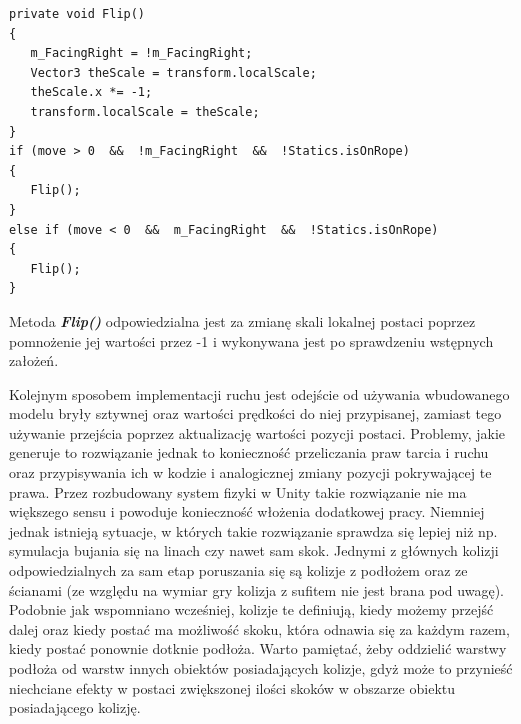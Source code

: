 \documentclass[oneside,polski,logo]{amuthesis}
\begin{document}
\begin{lstlisting}[breaklines=true,
language={[Sharp]C},
rulecolor=\color{blue!80!black},
caption={Fragment klasy \texttt{CharacterController.cs}}
]
private void Flip()
{
   m_FacingRight = !m_FacingRight;
   Vector3 theScale = transform.localScale;
   theScale.x *= -1;
   transform.localScale = theScale;
}
if (move > 0  &&  !m_FacingRight  &&  !Statics.isOnRope)
{
   Flip();
}
else if (move < 0  &&  m_FacingRight  &&  !Statics.isOnRope)
{ 
   Flip();
}
\end{lstlisting}

Metoda \textbf{\textit{Flip()}} odpowiedzialna jest za zmianę skali lokalnej postaci poprzez pomnożenie jej wartości przez -1 i wykonywana jest po sprawdzeniu wstępnych założeń.

Kolejnym sposobem implementacji ruchu jest odejście od używania wbudowanego modelu bryły sztywnej oraz wartości prędkości do niej przypisanej, zamiast tego używanie przejścia poprzez aktualizację wartości pozycji postaci. Problemy, jakie generuje to rozwiązanie jednak to konieczność przeliczania praw tarcia i ruchu oraz przypisywania ich w kodzie i analogicznej zmiany pozycji pokrywającej te prawa. Przez rozbudowany system fizyki w Unity takie rozwiązanie nie ma większego sensu i powoduje konieczność włożenia dodatkowej pracy. Niemniej jednak istnieją sytuacje, w których takie rozwiązanie sprawdza się lepiej niż np. symulacja bujania się na linach czy nawet sam skok.
Jednymi z głównych kolizji odpowiedzialnych za sam etap poruszania się są kolizje z podłożem oraz ze ścianami (ze względu na wymiar gry kolizja z sufitem nie jest brana pod uwagę). Podobnie jak wspomniano wcześniej, kolizje te definiują, kiedy możemy przejść dalej oraz kiedy postać ma możliwość skoku, która odnawia się za każdym razem, kiedy postać ponownie dotknie podłoża. Warto pamiętać, żeby oddzielić warstwy podłoża od warstw innych obiektów posiadających kolizje, gdyż może to przynieść niechciane efekty w postaci zwiększonej ilości skoków w obszarze obiektu posiadającego kolizję.
\end{document}
